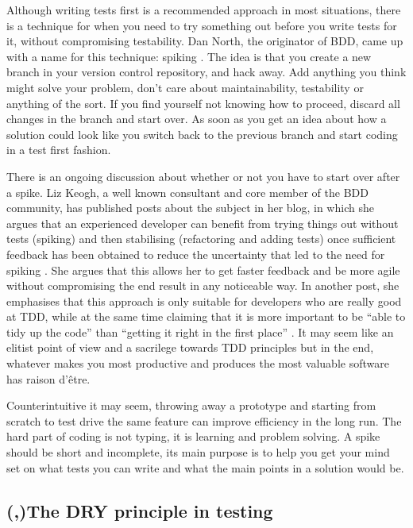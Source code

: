 \documentclass[11pt]{article}
\begin{document}
Although writing tests first is a recommended approach in most situations, there is a technique for when you need to try something out before you write tests for it, without compromising testability. Dan North, the originator of BDD, came up with a name for this technique: spiking \cite{TwitterDanNorth}. The idea is that you create a new branch in your version control repository, and hack away. Add anything you think might solve your problem, don't care about maintainability, testability or anything of the sort. If you find yourself not knowing how to proceed, discard all changes in the branch and start over. As soon as you get an idea about how a solution could look like you switch back to the previous branch and start coding in a test first fashion. \cite[question~59]{Edelstam}

There is an ongoing discussion about whether or not you have to start over after a spike. Liz Keogh, a well known consultant and core member of the BDD community, has published posts about the subject in her blog, in which she argues that an experienced developer can benefit from trying things out without tests (spiking) and then stabilising (refactoring and adding tests) once sufficient feedback has been obtained to reduce the uncertainty that led to the need for spiking \cite{Liz1}. She argues that this allows her to get faster feedback and be more agile without compromising the end result in any noticeable way. In another post, she emphasises that this approach is only suitable for developers who are really good at TDD, while at the same time claiming that it is more important to be ``able to tidy up the code'' than ``getting it right in the first place'' \cite{Liz2}. It may seem like an elitist point of view and a sacrilege towards TDD principles but in the end, whatever makes you most productive and produces the most valuable software has raison d'être.

Counterintuitive it may seem, throwing away a prototype and starting from scratch to test drive the same feature can improve efficiency in the long run. The hard part of coding is not typing, it is learning and problem solving. A spike should be short and incomplete, its main purpose is to help you get your mind set on what tests you can write and what the main points in a solution would be. \cite[question~60]{Edelstam}

\subsection{(,)The DRY principle in testing}
\end{document}
